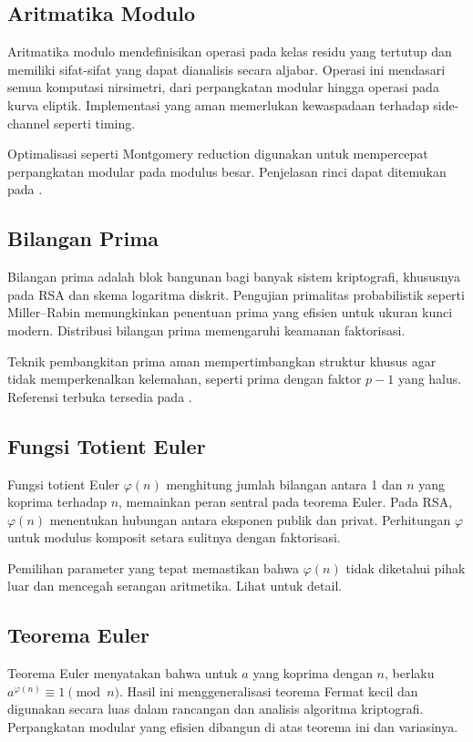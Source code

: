 \documentclass[../main.tex]{subfiles}
\begin{document}
\subsection{Aritmatika Modulo}
Aritmatika modulo mendefinisikan operasi pada kelas residu yang tertutup dan memiliki sifat-sifat yang dapat dianalisis secara aljabar. Operasi ini mendasari semua komputasi nirsimetri, dari perpangkatan modular hingga operasi pada kurva eliptik. Implementasi yang aman memerlukan kewaspadaan terhadap side-channel seperti timing.

Optimalisasi seperti Montgomery reduction digunakan untuk mempercepat perpangkatan modular pada modulus besar. Penjelasan rinci dapat ditemukan pada \textcite{menezes1996handbook}.

\subsection{Bilangan Prima}
Bilangan prima adalah blok bangunan bagi banyak sistem kriptografi, khususnya pada RSA dan skema logaritma diskrit. Pengujian primalitas probabilistik seperti Miller–Rabin memungkinkan penentuan prima yang efisien untuk ukuran kunci modern. Distribusi bilangan prima memengaruhi keamanan faktorisasi.

Teknik pembangkitan prima aman mempertimbangkan struktur khusus agar tidak memperkenalkan kelemahan, seperti prima dengan faktor \(p-1\) yang halus. Referensi terbuka tersedia pada \textcite{menezes1996handbook}.

\subsection{Fungsi Totient Euler}
Fungsi totient Euler \(\varphi(n)\) menghitung jumlah bilangan antara 1 dan \(n\) yang koprima terhadap \(n\), memainkan peran sentral pada teorema Euler. Pada RSA, \(\varphi(n)\) menentukan hubungan antara eksponen publik dan privat. Perhitungan \(\varphi\) untuk modulus komposit setara sulitnya dengan faktorisasi.

Pemilihan parameter yang tepat memastikan bahwa \(\varphi(n)\) tidak diketahui pihak luar dan mencegah serangan aritmetika. Lihat \textcite{menezes1996handbook} untuk detail.

\subsection{Teorema Euler}
Teorema Euler menyatakan bahwa untuk \(a\) yang koprima dengan \(n\), berlaku \(a^{\varphi(n)} \equiv 1 \pmod{n}\). Hasil ini menggeneralisasi teorema Fermat kecil dan digunakan secara luas dalam rancangan dan analisis algoritma kriptografi. Perpangkatan modular yang efisien dibangun di atas teorema ini dan variasinya.
\end{document}
